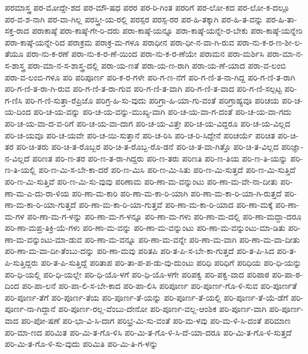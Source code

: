 {ಪರಮಾಸ್ತ್ರ
ಪರ-ಮೋದ್ದೇ-ಶದ
ಪರ-ಮೌ-ಷಧ
ಪರರ
ಪರ-ರಿ-ಗಿಂತ
ಪರರಿಗೆ
ಪರ-ಲೋ-ಕದ
ಪರ-ಲೋ-ಕ-ದಲ್ಲೂ
ಪರ-ವ-ಶ-ನಾಗಿ
ಪರ-ವಾ-ಗಿಲ್ಲ
ಪರಸ್ತ್ರೀ-ಯ-ರಲ್ಲಿ
ಪರಸ್ಪರ
ಪರಸ್ಪ-ರರ
ಪರ-ಹಿ-ತಕ್ಕಾಗಿ
ಪರ-ಹಿ-ತ-ವನ್ನು
ಪರ-ಹಿ-ತಾ-ಸಕ್ತ-ರಾದ
ಪರಾಕಾಷ್ಠೆ
ಪರಾ-ಕಾಷ್ಠೆ-ಗೇ-ರಿ-ದರು
ಪರಾ-ಕಾಷ್ಠೆ-ಯನ್ನೂ
ಪರಾ-ಕಾಷ್ಠೆ-ಯನ್ನೇ-ರ-ಬೇಕು
ಪರಾ-ಕಾಷ್ಠೆ-ಯನ್ನೇರಿ
ಪರಾ-ಕಾಷ್ಠೆ-ಯನ್ನೇ-ರಿದ
ಪರಾಕ್ರಮ
ಪರಾಕ್ರ-ಮ-ಗಳೂ
ಪರಾಧೀನ
ಪರಾ-ಧೀ-ನ-ವಾ-ಗಿ-ರುವ
ಪರಾ-ನು-ಕ-ರ-ಣ-ಶೀ-ಲ-ತೆಯೂ
ಪರಾ-ನು-ಕ-ರಣೆ
ಪರಾ-ನು-ಕ-ರ-ಣೆ-ಯಿಂದ
ಪರಾ-ನು-ಕ-ರ-ಣೆಯೇ
ಪರಾಮನ
ಪರಾ-ಮರ್ಶಿಸಿ
ಪರಾ-ಮಾ-ನ-ಸ-ಶಾಸ್ತ್ರ
ಪರಾ-ಮಾ-ನ-ಸ-ಶಾಸ್ತ್ರ-ದಲ್ಲಿ
ಪರಾ-ಯ-ಣತೆ
ಪರಾ-ಯ-ಣ-ರಾಗಿ
ಪರಾ-ಯ-ಣೆ-ಯಾದ
ಪರಾ-ವ-ಲಂಬಿ
ಪರಾ-ವ-ಲಂಬಿ-ಗಳೂ
ಪರಿ
ಪರಿಪೂರ್ಣ
ಪರಿ-ಕ-ರ-ಗಳೇ
ಪರಿ-ಗ-ಣ-ನೆಗೆ
ಪರಿ-ಗ-ಣಿ-ತ-ನಾ-ಗಿದ್ದ
ಪರಿ-ಗ-ಣಿ-ತ-ರಾಗಿ
ಪರಿ-ಗ-ಣಿ-ತ-ರಾ-ಗಿ-ರುವ
ಪರಿ-ಗ-ಣಿ-ತ-ರಾ-ಗುವ
ಪರಿ-ಗ-ಣಿ-ತ-ವಾಗಿ
ಪರಿ-ಗ-ಣಿ-ತ-ವಾದ
ಪರಿ-ಗ-ಣಿ-ಸಲ್ಪಟ್ಟ
ಪರಿ-ಗ-ಣಿಸಿ
ಪರಿ-ಗ-ಣಿ-ಸುತ್ತಾ-ರೆಪ್ರಿಜೊ
ಪರಿಗ್ರ-ಹಿ-ಸು-ವುದು
ಪರಿಗ್ರಾ-ಹಿ-ಯಾ-ಗು-ವಂತೆ
ಪರಿಗ್ರಾಹ್ಯವೂ
ಪರಿಚಯ
ಪರಿ-ಚ-ಯ-ದಿಂದ
ಪರಿ-ಚ-ಯ-ವನ್ನು
ಪರಿ-ಚ-ಯ-ವನ್ನು-ಮುಖ್ಯ-ವಾಗಿ
ಪರಿ-ಚ-ಯ-ವಾ-ಗ-ದಂತೆ
ಪರಿ-ಚ-ಯ-ವಾ-ಗದು
ಪರಿ-ಚ-ಯ-ವಾ-ದ-ವ-ರಿಗೆ
ಪರಿ-ಚ-ಯ-ವಾ-ದಾಗ
ಪರಿ-ಚ-ಯ-ವಿತ್ತೇ
ಪರಿ-ಚ-ಯ-ವಿದ್ದರೂ
ಪರಿ-ಚ-ಯ-ವಿಲ್ಲದ
ಪರಿ-ಚ-ಯವೂ
ಪರಿ-ಚ-ಯವೇ
ಪರಿ-ಚ-ಯಿ-ಸುತ್ತಾನೆ
ಪರಿ-ಚ-ರಿಸಿ
ಪರಿ-ಚ-ರಿ-ಸಿದ್ದೇನೆ
ಪರಿಚರ್ಯೆ
ಪರಿಚಿತ
ಪರಿ-ಚಿ-ತರ
ಪರಿ-ಚಿ-ತರು
ಪರಿ-ಚಿ-ತ-ರೊಬ್ಬರ
ಪರಿ-ಚಿ-ತ-ರೊಬ್ಬ-ರೊ-ಡನೆ
ಪರಿ-ಚಿ-ತ-ವಾ-ಗಿತ್ತೊ
ಪರಿ-ಚಿ-ತ-ವಿಲ್ಲದ
ಪರಿಜ್ಞಾ-ನ-ವಿಲ್ಲದೆ
ಪರಿಣತ
ಪರಿ-ಣ-ತರ
ಪರಿ-ಣ-ತ-ರಾ-ಗಿದ್ದರು
ಪರಿ-ಣ-ತರು
ಪರಿಣತಿ
ಪರಿ-ಣ-ತಿಯ
ಪರಿ-ಣ-ತಿ-ಯನ್ನು
ಪರಿ-ಣ-ತಿ-ಯಲ್ಲಿ
ಪರಿ-ಣ-ಮಿ-ಸ-ಬೇ-ಕಾ-ದರೆ
ಪರಿ-ಣ-ಮಿಸಿ
ಪರಿ-ಣ-ಮಿ-ಸಿತು
ಪರಿ-ಣ-ಮಿ-ಸುತ್ತದೆ
ಪರಿ-ಣ-ಮಿ-ಸುತ್ತಿದೆ
ಪರಿ-ಣ-ಮಿ-ಸುತ್ತಿವೆ
ಪರಿ-ಣ-ಮಿ-ಸು-ವುವು
ಪರಿಣಾಮ
ಪರಿ-ಣಾ-ಮ-ವನ್ನುಂಟು
ಪರಿ-ಣಾ-ಮ-ವೇ-ನಾ-ದೀತು
ಪರಿ-ಣಾ-ಮ-ಎ-ದು-ರಾ-ಳಿಯ
ಪರಿ-ಣಾ-ಮ-ಕಾರಿ
ಪರಿ-ಣಾ-ಮ-ಕಾ-ರಿ-ಯಾಗಿ
ಪರಿ-ಣಾ-ಮ-ಕಾ-ರಿ-ಯಾ-ಗಿ-ರುತ್ತದೆ
ಪರಿ-ಣಾ-ಮ-ಕಾ-ರಿ-ಯಾ-ಗುತ್ತದೆ
ಪರಿ-ಣಾ-ಮ-ಕಾ-ರಿ-ಯಾ-ಗುತ್ತವೆ
ಪರಿ-ಣಾ-ಮ-ಕಾ-ರಿ-ಯಾದ
ಪರಿ-ಣಾ-ಮಕ್ಕೆ
ಪರಿ-ಣಾ-ಮ-ಗಳ
ಪರಿ-ಣಾ-ಮ-ಗ-ಳನ್ನು
ಪರಿ-ಣಾ-ಮ-ಗ-ಳನ್ನೂ
ಪರಿ-ಣಾ-ಮ-ಗಳು
ಪರಿ-ಣಾ-ಮ-ದಲ್ಲಿ
ಪರಿ-ಣಾ-ಮದ್ದಾ-ದರೂ
ಪರಿ-ಣಾ-ಮಪ್ರ-ತಿಕ್ರಿ-ಯೆ-ಗಳು
ಪರಿ-ಣಾ-ಮ-ವನ್ನು
ಪರಿ-ಣಾ-ಮ-ವನ್ನುಂಟು
ಪರಿ-ಣಾ-ಮ-ವನ್ನುಂಟು-ಮಾ-ಡಿತು
ಪರಿ-ಣಾ-ಮ-ವನ್ನುಂಟು-ಮಾ-ಡುವ
ಪರಿ-ಣಾ-ಮ-ವನ್ನೂ
ಪರಿ-ಣಾ-ಮ-ವನ್ನೇ
ಪರಿ-ಣಾ-ಮ-ವಾಗಿ
ಪರಿ-ಣಾ-ಮ-ವಾ-ದೀತು
ಪರಿ-ಣಾ-ಮ-ವಾ-ದೀ-ತೆಂಬು-ದನ್ನು
ಪರಿ-ಣಾ-ಮವು
ಪರಿತಪಿ
ಪರಿ-ತ-ಪಿ-ಸ-ಬೇ-ಕಾ-ಗುತ್ತದೆ
ಪರಿ-ತ-ಪಿ-ಸಿದ
ಪರಿ-ತ-ಪಿ-ಸುತ್ತಿದ್ದರು
ಪರಿ-ತ-ಪಿ-ಸುತ್ತಿದ್ದೆ
ಪರಿತಾಪ
ಪರಿ-ತಾ-ಪ-ಪ-ಡು-ವು-ದುಂಟು
ಪರಿಧಿ
ಪರಿಧಿಗೆ
ಪರಿಧಿಯ
ಪರಿ-ಧಿ-ಯನ್ನು
ಪರಿ-ಧಿ-ಯಲ್ಲಿ
ಪರಿ-ಧಿ-ಯಲ್ಲೇ
ಪರಿ-ಧಿ-ಯೊ-ಳಗೆ
ಪರಿ-ಧಿ-ಯೊ-ಳಗೇ
ಪರಿಪಕ್ವ
ಪರಿ-ಪಕ್ವ-ವಾದ
ಪರಿಪಾಠ
ಪರಿ-ಪಾ-ಠ-ದಿಂದ
ಪರಿ-ಪಾ-ಲನೆ
ಪರಿ-ಪಾ-ಲಿ-ಸ-ಬೇ-ಕಾದ
ಪರಿ-ಪಾ-ಲಿಸಿ
ಪರಿಪೂರ್ಣ
ಪರಿ-ಪೂರ್ಣ-ಗೊ-ಳಿ-ಸುವ
ಪರಿ-ಪೂರ್ಣತೆ
ಪರಿ-ಪೂರ್ಣ-ತೆಗೆ
ಪರಿ-ಪೂರ್ಣ-ತೆಯ
ಪರಿ-ಪೂರ್ಣ-ತೆ-ಯನ್ನು
ಪರಿ-ಪೂರ್ಣ-ತೆ-ಯಲ್ಲಿ
ಪರಿ-ಪೂರ್ಣ-ತೆ-ಯೆ-ಡೆಗೆ
ಪರಿ-ಪೂರ್ಣ-ನಾ-ಗಿದ್ದಾನೆ
ಪರಿ-ಪೂರ್ಣ-ರಲ್ಲ-ವೆಂಬು-ದೇನೋ
ಪರಿ-ಪೂರ್ಣ-ವಲ್ಲ-ಆಂಶಿಕ
ಪರಿ-ಪೂರ್ಣ-ವಾಗಿ
ಪರಿ-ಪೂರ್ಣ-ವಾದ
ಪರಿ-ಪೋ-ಷಣೆ
ಪರಿ-ಭಾ-ವಿ-ಸಿ-ದಾಗ
ಪರಿಭ್ರ-ಮಿ-ಸು-ವಂತೆ
ಪರಿ-ಮ-ಳವು
ಪರಿ-ಮ-ಳಿ-ಸಿ-ದಂತೆ
ಪರಿಮಾಣ
ಪರಿ-ಮಾ-ಣದ
ಪರಿಮಿತ
ಪರಿ-ಮಿ-ತ-ಗೊ-ಳಿಸಿ
ಪರಿ-ಮಿ-ತ-ಗೊ-ಳಿ-ಸಿ-ದೆ-ಯಾ-ದರೂ
ಪರಿ-ಮಿ-ತ-ಗೊ-ಳಿ-ಸುತ್ತದೆ
ಪರಿ-ಮಿ-ತ-ಗೊ-ಳಿ-ಸು-ವುದು
ಪರಿಮಿತಿ
ಪರಿ-ಮಿ-ತಿ-ಗ-ಳನ್ನು
}
